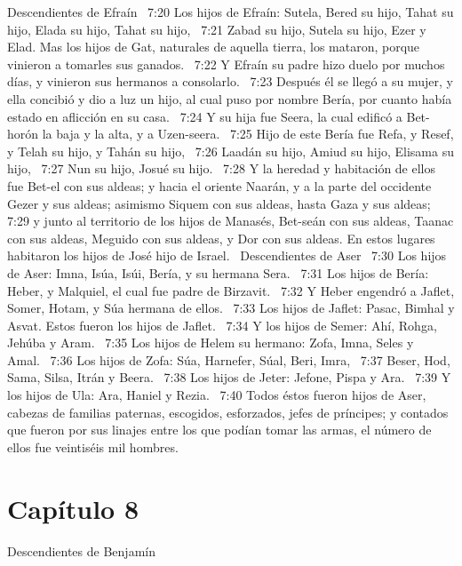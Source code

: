 Descendientes de Efraín  
7:20 Los hijos de Efraín: Sutela, Bered su hijo, Tahat su hijo, Elada su hijo, Tahat su hijo,  
7:21 Zabad su hijo, Sutela su hijo, Ezer y Elad. Mas los hijos de Gat, naturales de aquella tierra, los mataron, porque vinieron a tomarles sus ganados.  
7:22 Y Efraín su padre hizo duelo por muchos días, y vinieron sus hermanos a consolarlo.  
7:23 Después él se llegó a su mujer, y ella concibió y dio a luz un hijo, al cual puso por nombre Bería, por cuanto había estado en aflicción en su casa.  
7:24 Y su hija fue Seera, la cual edificó a Bet-horón la baja y la alta, y a Uzen-seera.  
7:25 Hijo de este Bería fue Refa, y Resef, y Telah su hijo, y Tahán su hijo,  
7:26 Laadán su hijo, Amiud su hijo, Elisama su hijo,  
7:27 Nun su hijo, Josué su hijo.  
7:28 Y la heredad y habitación de ellos fue Bet-el con sus aldeas; y hacia el oriente Naarán, y a la parte del occidente Gezer y sus aldeas; asimismo Siquem con sus aldeas, hasta Gaza y sus aldeas;  
7:29 y junto al territorio de los hijos de Manasés, Bet-seán con sus aldeas, Taanac con sus aldeas, Meguido con sus aldeas, y Dor con sus aldeas. En estos lugares habitaron los hijos de José hijo de Israel.  
Descendientes de Aser  
7:30 Los hijos de Aser: Imna, Isúa, Isúi, Bería, y su hermana Sera.  
7:31 Los hijos de Bería: Heber, y Malquiel, el cual fue padre de Birzavit.  
7:32 Y Heber engendró a Jaflet, Somer, Hotam, y Súa hermana de ellos.  
7:33 Los hijos de Jaflet: Pasac, Bimhal y Asvat. Estos fueron los hijos de Jaflet.  
7:34 Y los hijos de Semer: Ahí, Rohga, Jehúba y Aram.  
7:35 Los hijos de Helem su hermano: Zofa, Imna, Seles y Amal.  
7:36 Los hijos de Zofa: Súa, Harnefer, Súal, Beri, Imra,  
7:37 Beser, Hod, Sama, Silsa, Itrán y Beera.  
7:38 Los hijos de Jeter: Jefone, Pispa y Ara.  
7:39 Y los hijos de Ula: Ara, Haniel y Rezia.  
7:40 Todos éstos fueron hijos de Aser, cabezas de familias paternas, escogidos, esforzados, jefes de príncipes; y contados que fueron por sus linajes entre los que podían tomar las armas, el número de ellos fue veintiséis mil hombres.  
\section*{Capítulo 8 }
Descendientes de Benjamín  

